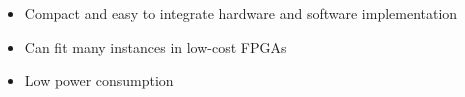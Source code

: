 %

\begin{itemize}
  \itemsep-0.5em
\item Compact and easy to integrate hardware and software implementation
\item Can fit many instances in low-cost FPGAs
\item Low power consumption
\end{itemize}
